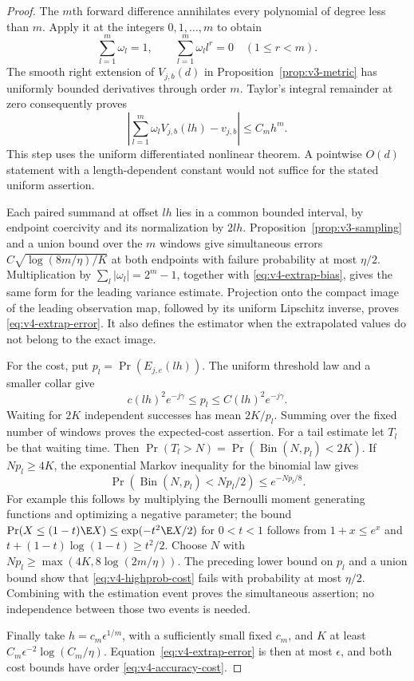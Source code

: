 \begin{proof}
The $m$th forward difference annihilates every polynomial of degree
less than $m$. Apply it at the integers $0,1,\ldots,m$ to obtain
\[
 \sum_{l=1}^m\omega_l=1,\qquad
 \sum_{l=1}^m\omega_l l^r=0\quad(1\le r<m).
\]
The smooth right extension of $V_{j,b}(d)$ in
Proposition~\ref{prop:v3-metric} has uniformly bounded derivatives
through order $m$. Taylor's integral remainder at zero consequently
proves
\begin{equation}\label{eq:v4-extrap-bias}
 \left|\sum_{l=1}^m\omega_l V_{j,b}(lh)-v_{j,b}\right|
                                        \le C_mh^m.
\end{equation}
This step uses the uniform differentiated nonlinear theorem. A
pointwise $O(d)$ statement with a length-dependent constant would
not suffice for the stated uniform assertion.

Each paired summand at offset $lh$ lies in a common bounded interval,
by endpoint coercivity and its normalization by $2lh$.
Proposition~\ref{prop:v3-sampling} and a union bound over the $m$
windows give simultaneous errors
$C\sqrt{\log(8m/\eta)/K}$ at both endpoints with failure probability
at most $\eta/2$. Multiplication by
$\sum_l|\omega_l|=2^m-1$, together with
\eqref{eq:v4-extrap-bias}, gives the same form for the leading
variance estimate. Projection onto the compact image of the leading
observation map, followed by its uniform Lipschitz inverse, proves
\eqref{eq:v4-extrap-error}. It also defines the estimator when the
extrapolated values do not belong to the exact image.

For the cost, put $p_l=\Pr(E_{j,e}(lh))$. The uniform threshold law
and a smaller collar give
\[
 c(lh)^2e^{-j\gamma}\le p_l\le C(lh)^2e^{-j\gamma}.
\]
Waiting for $2K$ independent successes has mean $2K/p_l$. Summing
over the fixed number of windows proves the expected-cost assertion.
For a tail estimate let $T_l$ be that waiting time. Then
$\Pr(T_l>N)=\Pr(\operatorname{Bin}(N,p_l)<2K)$.
If $Np_l\ge4K$, the exponential Markov inequality for the binomial
law gives
\[
 \Pr(\operatorname{Bin}(N,p_l)<Np_l/2)\le e^{-Np_l/8}.
\]
For example this follows by multiplying the Bernoulli moment
generating functions and optimizing a negative parameter; the bound
$\Pr(X\le(1-t)\E X)\le\exp(-t^2\E X/2)$ for $0<t<1$
follows from $1+x\le e^x$ and
$t+(1-t)\log(1-t)\ge t^2/2$.
Choose $N$ with
$Np_l\ge\max(4K,8\log(2m/\eta))$.
The preceding lower bound on $p_l$ and a union bound show that
\eqref{eq:v4-highprob-cost} fails with probability at most $\eta/2$.
Combining with the estimation event proves the simultaneous assertion;
no independence between those two events is needed.

Finally take $h=c_m\epsilon^{1/m}$, with a sufficiently small fixed
$c_m$, and $K$ at least $C_m\epsilon^{-2}\log(C_m/\eta)$.
Equation~\eqref{eq:v4-extrap-error} is then at most $\epsilon$, and
both cost bounds have order \eqref{eq:v4-accuracy-cost}.
\end{proof}

